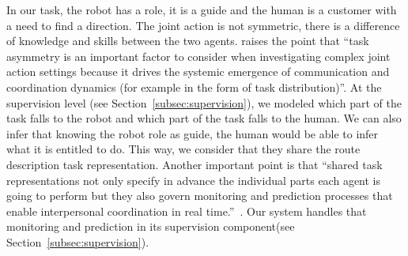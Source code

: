\documentclass[a4paper,11pt,twoside]{StyleThese}
\begin{document}
In our task, the robot has a role, it is a guide and the human is a customer with a need to find a direction. The joint action is not symmetric, there is a difference of knowledge and skills between the two agents. \citet[p.~11]{curioni_2017_joint} raises the point that ``task asymmetry is an important factor to consider when investigating complex joint action settings because it drives the systemic emergence of communication and coordination dynamics (for example in the form of task distribution)''. At the supervision level (see Section~\ref{subsec:supervision}), we modeled which part of the task falls to the robot and which part of the task falls to the human. We can also infer that knowing the robot role as guide, the human would be able to infer what it is entitled to do. This way, we consider that they share the route description task representation. 
Another important point is that ``shared task representations not only specify in advance the individual parts each agent is going to perform but they also govern monitoring and prediction processes that enable interpersonal coordination in real time.''~\citep[p.~65]{knoblich_2011_joint}. Our system handles that monitoring and prediction in its supervision component(see Section~\ref{subsec:supervision}).
%
%
%
%
\end{document}
